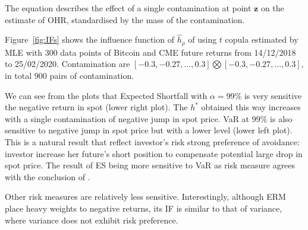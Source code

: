 
The equation describes the effect of a single contamination at point $\bm{z}$ on the estimate of OHR,
standardised by the mass of the contamination. \medskip

Figure~\ref{fig:IFs} shows the influence function of $\hat h_\rho$ of using $t$ copula estimated by MLE with 300 data points of
Bitcoin and CME future returns from 14/12/2018 to 25/02/2020.
Contamination are $[-0.3,-0.27,..., 0.3] \bigotimes [-0.3,-0.27,..., 0.3]$, in total $900$ pairs of contamination. \medskip

We can see from the plots that Expected Shortfall with $\alpha = 99\%$ is very sensitive the negative return in spot (lower right plot).
The $h^*$ obtained this way increases with a single contamination of negative jump in spot price.
VaR at $99\%$ is also sensitive to negative jump in spot price but with a lower level (lower left plot).
This is a natural result that reflect investor's risk strong preference of avoidance: investor increase her future's short position
to compensate potential large drop in spot price.
The result of ES being more sensitive to VaR as risk measure agrees with the conclusion of \citet{cont2010robustness}. \medskip

Other risk measures are relatively less sensitive.
Interestingly, although ERM place heavy weights to negative returns,
its IF is similar to that of variance, where variance does not exhibit risk preference.

